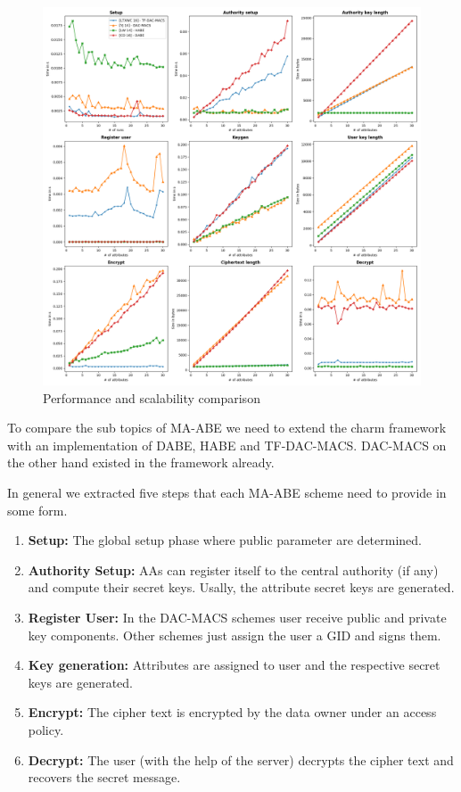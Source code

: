 \begin{figure}[!ht]
\centering
    \includegraphics[width=1\linewidth]{img/maabe_comparisons.png}
    \caption{Performance and scalability comparison}
    \label{fig:maabe_comparison}
\end{figure}

To compare the sub topics of \ac{MA-ABE} we need to extend the charm framework with an implementation of \ac{DABE}, \ac{HABE} and \ac{TF-DAC-MACS}. \ac{DAC-MACS} on the other hand existed in the framework already. 

In general we extracted five steps that each \ac{MA-ABE} scheme need to provide in some form. 
\begin{enumerate}
	\item \textbf{Setup:} The global setup phase where public parameter are determined.
	\item \textbf{Authority Setup:} \ac{AA}s can register itself to the central authority (if any) and compute their secret keys. Usally, the attribute secret keys are generated. 
	\item \textbf{Register User:} In the \ac{DAC-MACS} schemes user receive public and private key components. Other schemes just assign the user a \ac{GID} and signs them.
	\item \textbf{Key generation:} Attributes are assigned to user and the respective secret keys are generated.
	\item \textbf{Encrypt:} The cipher text is encrypted by the data owner under an access policy.
	\item \textbf{Decrypt:} The user (with the help of the server) decrypts the cipher text and recovers the secret message. 
\end{enumerate}

